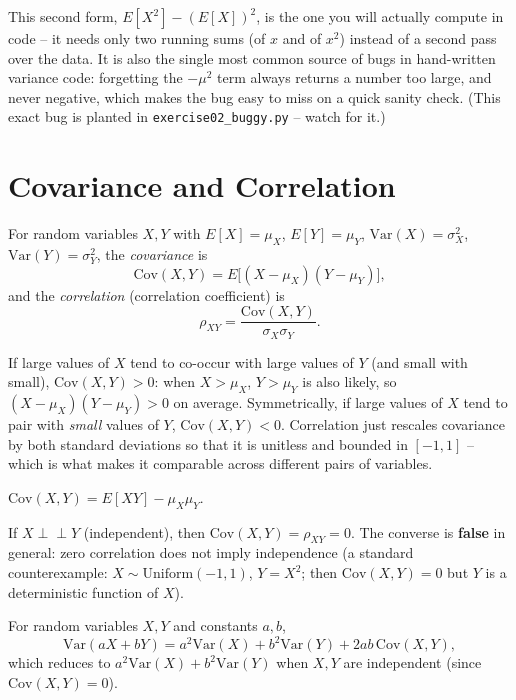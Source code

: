 \documentclass[11pt]{article}
\begin{document}
This second form, $E[X^2] - (E[X])^2$, is the one you will actually compute
in code -- it needs only two running sums (of $x$ and of $x^2$) instead of a
second pass over the data. It is also the single most common source of bugs
in hand-written variance code: forgetting the $-\mu^2$ term always returns a
number too large, and never negative, which makes the bug easy to miss on
a quick sanity check. (This exact bug is planted in
\texttt{exercise02\_buggy.py} -- watch for it.)

\section{Covariance and Correlation}

\begin{definition}
For random variables $X, Y$ with $E[X] = \mu_X$, $E[Y] = \mu_Y$,
$\mathrm{Var}(X) = \sigma_X^2$, $\mathrm{Var}(Y) = \sigma_Y^2$, the
\emph{covariance} is
\[
  \mathrm{Cov}(X,Y) = E\big[(X-\mu_X)(Y-\mu_Y)\big],
\]
and the \emph{correlation} (correlation coefficient) is
\[
  \rho_{XY} = \frac{\mathrm{Cov}(X,Y)}{\sigma_X \sigma_Y}.
\]
\end{definition}

If large values of $X$ tend to co-occur with large values of $Y$ (and small
with small), $\mathrm{Cov}(X,Y) > 0$: when $X > \mu_X$, $Y > \mu_Y$ is also
likely, so $(X-\mu_X)(Y-\mu_Y) > 0$ on average. Symmetrically, if large
values of $X$ tend to pair with \emph{small} values of $Y$,
$\mathrm{Cov}(X,Y) < 0$. Correlation just rescales covariance by both
standard deviations so that it is unitless and bounded in $[-1, 1]$ --
which is what makes it comparable across different pairs of variables.

\begin{theorem}
$\mathrm{Cov}(X,Y) = E[XY] - \mu_X \mu_Y$.
\end{theorem}

\begin{theorem}
If $X \perp\!\!\!\perp Y$ (independent), then $\mathrm{Cov}(X,Y) =
\rho_{XY} = 0$. The converse is \textbf{false} in general: zero correlation
does not imply independence (a standard counterexample: $X \sim
\mathrm{Uniform}(-1,1)$, $Y = X^2$; then $\mathrm{Cov}(X,Y) = 0$ but $Y$ is a
deterministic function of $X$).
\end{theorem}

\begin{theorem}
For random variables $X, Y$ and constants $a, b$,
\[
  \mathrm{Var}(aX + bY) = a^2 \mathrm{Var}(X) + b^2 \mathrm{Var}(Y) +
  2ab\,\mathrm{Cov}(X,Y),
\]
which reduces to $a^2\mathrm{Var}(X) + b^2\mathrm{Var}(Y)$ when $X, Y$ are
independent (since $\mathrm{Cov}(X,Y)=0$).
\end{theorem}
\end{document}
